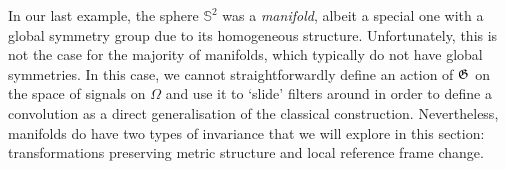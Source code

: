 



In our last example, the %
sphere $\mathbb{S}^2$ 
was a {\em manifold}, albeit a special one 
%
with a global symmetry group due to its homogeneous structure. 
%
Unfortunately, this is not the case for the majority of manifolds, which typically do not have global symmetries. 
%
In this case, we cannot straightforwardly define an action of ${\mathfrak{G}}$ on the space of signals on $\Omega$ and use it to `slide' filters around in order to define a convolution as a direct generalisation of the classical construction. 
%
Nevertheless, manifolds do have two types of invariance %
that we will explore in this section: transformations preserving metric structure and local reference frame change.  

